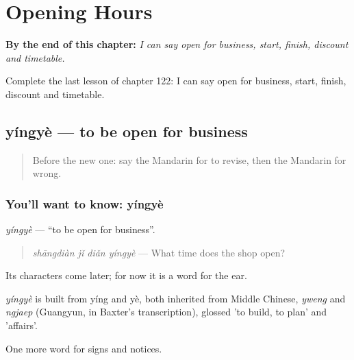 
\chapter{Opening Hours}
\label{ch:zh-opening-hours}

\begin{chapteropening}
\textbf{By the end of this chapter:} \emph{I can say open for business, start, finish, discount and timetable.}

Complete the last lesson of chapter 122: I can say open for business, start, finish, discount and timetable.
\end{chapteropening}

\section[yíngyè]{yíngyè — to be open for business}

\label{lesson:ZH-C122-yingye}



\begin{quote}
Before the new one: say the Mandarin for to revise, then the Mandarin for wrong.
\end{quote}

\subsection*{You'll want to know: yíngyè}
\emph{yíngyè} — \textquotedblleft{}to be open for business\textquotedblright{}.

\begin{quote}
\emph{shāngdiàn jǐ diǎn yíngyè} — What time does the shop open?
\end{quote}

Its characters come later; for now it is a word for the ear.

\begin{cousinweb}
\emph{yíngyè} is built from yíng and yè, both inherited from Middle Chinese, \emph{yweng} and \emph{ngjaep} (Guangyun, in Baxter's transcription), glossed 'to build, to plan' and 'affairs'.
\end{cousinweb}

\begin{grammarlens}[title={What you've built}]
One more word for signs and notices.
\end{grammarlens}

